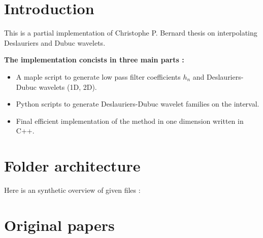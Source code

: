 


 

\maketitle 
\tableofcontents

\section{Introduction}

This is a partial implementation of Christophe P. Bernard thesis on interpolating Deslauriers and Dubuc wavelets.

\vskip 0.5cm
\noindent \textbf{The implementation concists in three main parts :}

\begin{itemize}
    \item A maple script to generate low pass filter coefficients $h_n$ and Deslauriers-Dubuc wavelets (1D, 2D).
    \item Python scripts to generate Deslauriers-Dubuc wavelet families on the interval.
    \item Final efficient implementation of the method in one dimension written in C++.
\end{itemize}

\clearpage
\section{Folder architecture}

\renewcommand*\DTstylecomment{\color{black}}
\renewcommand*\DTstyle{\ttfamily\textcolor{red}}

Here is an synthetic overview of given files :
\vskip 0.3cm


\section{Original papers}

